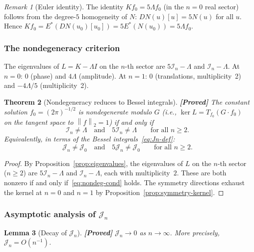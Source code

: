 \documentclass[12pt]{article}
\newtheorem{theorem}{Theorem}[section]
\newtheorem{lemma}[theorem]{Lemma}
\theoremstyle{definition}
\theoremstyle{remark}
\newtheorem{remark}[theorem]{Remark}
\newcommand{\norm}[1]{\left\|#1\right\|}
\newcommand{\proven}{\textbf{\color{teal}[Proved]}}
\begin{document}
\begin{remark}[Euler identity]
  The identity $Kf_0=5\Lambda f_0$ (in the $n=0$ real sector) follows from
  the degree-$5$ homogeneity of $N$: $DN(u)[u]=5N(u)$ for all $u$.
  Hence $Kf_0=E^*(DN(u_0)[u_0])=5E^*(N(u_0))=5\Lambda f_0$.
\end{remark}

\subsubsection{The nondegeneracy criterion}

The eigenvalues of $L=K-\Lambda I$ on the $n$-th sector are
$5\mathcal I_n-\Lambda$ and $\mathcal I_n-\Lambda$.  At $n=0$: $0$ (phase)
and $4\Lambda$ (amplitude).  At $n=1$: $0$ (translations, multiplicity~2) and
$-4\Lambda/5$ (multiplicity~2).

\begin{theorem}[Nondegeneracy reduces to Bessel integrals]
  \label{thm:nondeg-criterion}
  \proven\quad
  The constant solution $f_0=(2\pi)^{-1/2}$ is nondegenerate modulo
  $G$ (i.e., $\ker L=T_{f_0}(G\cdot f_0)$ on the tangent space to
  $\norm{f}_2=1$) if and only if
  \begin{equation}  \label{eq:nondeg-cond}
    \boxed{
    \mathcal I_n\neq\Lambda
    \quad\text{and}\quad
    5\mathcal I_n\neq\Lambda
    \qquad\text{for all } n\geq 2.}
  \end{equation}
  Equivalently, in terms of the Bessel integrals~\eqref{eq:Jn-def}:
  \[
    \mathcal J_n\neq\mathcal J_0
    \quad\text{and}\quad
    5\mathcal J_n\neq\mathcal J_0
    \qquad\text{for all } n\geq 2.
  \]
\end{theorem}

\begin{proof}
  By Proposition~\ref{prop:eigenvalues}, the eigenvalues of $L$ on the
  $n$-th sector ($n\geq 2$) are $5\mathcal I_n-\Lambda$ and
  $\mathcal I_n-\Lambda$, each with multiplicity~$2$.  These are both
  nonzero if and only if~\eqref{eq:nondeg-cond} holds.  The symmetry
  directions exhaust the kernel at $n=0$ and $n=1$ by
  Proposition~\ref{prop:symmetry-kernel}.
\end{proof}

\subsubsection{Asymptotic analysis of $\mathcal J_n$}

\begin{lemma}[Decay of $\mathcal J_n$]
  \label{lem:Jn-decay}
  \proven\quad
  $\mathcal J_n\to 0$ as $n\to\infty$.  More precisely,
  $\mathcal J_n=O(n^{-1})$.
\end{lemma}
\end{document}
